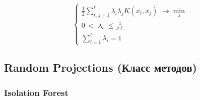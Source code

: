 \begin{itemize}
\begin{itemize}
\begin{equation*}
\begin{cases}
                                    \frac{1}{2} \sum\limits_{i\,,j = 1}^\ell \lambda_i \lambda_j K(x_i, x_j) \,\, \longrightarrow \min\limits_{\lambda} \\

                                    0 \,< \,\, \lambda_i \,\, \leq \frac{1}{\nu \ell} \\

                                    \sum\limits_{i = 1}^\ell \lambda_i = 1
                                \end{cases}
                            \end{equation*}
                \end{itemize}
            \end{itemize}


    \subsection{Random Projections (Класс методов)}

        \subsubsection{Isolation Forest}

